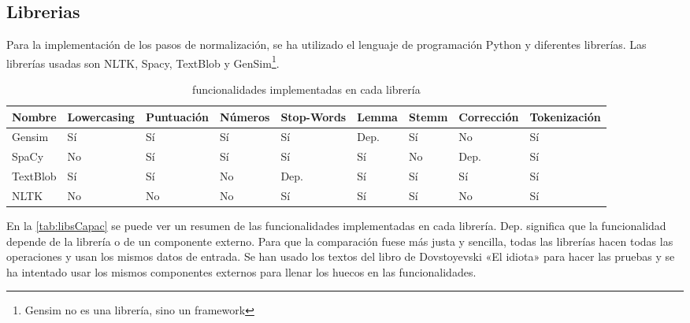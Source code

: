 \documentclass[a4paper,twocolumn]{article}
\begin{document}
    \subsection{Librerias}\label{subsec:libs}
    Para la implementación de los pasos de normalización, se ha utilizado el lenguaje de programación Python y diferentes librerías.
    Las librerías usadas son NLTK, Spacy, TextBlob y GenSim\footnote{Gensim no es una librería, sino un framework}.

    \begin{table}[h]
        \centering

        \begin{adjustbox}{max width=\textwidth/2}

            \begin{tabular}{lllllllll}
                \toprule
                \textbf{Nombre} & \textbf{Lowercasing} & \textbf{Puntuación} & \textbf{Números} & \textbf{Stop-Words} & \textbf{Lemma} & \textbf{Stemm} & \textbf{Corrección} & \textbf{Tokenización} \\
                \midrule
                Gensim          & Sí                   & Sí                  & Sí               & Sí                  & Dep.           & Sí             & No                  & Sí                    \\
                SpaCy           & No                   & Sí                  & Sí               & Sí                  & Sí             & No             & Dep.                & Sí                    \\
                TextBlob        & Sí                   & Sí                  & No               & Dep.                & Sí             & Sí             & Sí                  & Sí                    \\
                NLTK            & No                   & No                  & No               & Sí                  & Sí             & Sí             & No                  & Sí                    \\
                \bottomrule
            \end{tabular}
        \end{adjustbox}
        \caption{funcionalidades implementadas en cada librería}
        \label{tab:libsCapac}
    \end{table}


    En la \autoref{tab:libsCapac} se puede ver un resumen de las funcionalidades implementadas en cada librería.
    Dep. significa que la funcionalidad depende de la librería o de un componente externo.
    Para que la comparación fuese más justa y sencilla, todas las librerías hacen todas las operaciones y usan los mismos datos de entrada.
    Se han usado los textos del libro de Dovstoyevski «El idiota»\cite{Dovstoyevski.theidiot} para hacer las pruebas y se ha intentado usar los mismos componentes externos para llenar los huecos en las funcionalidades.
\end{document}
